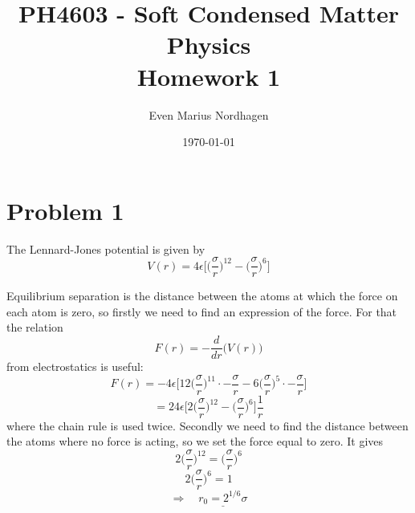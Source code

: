 \documentclass[norsk,a4paper,12pt]{article}
\title{PH4603 - Soft Condensed Matter Physics\\\vspace{2mm} \Large{Homework 1}}
\author{\large Even Marius Nordhagen}
\date\today
\begin{document}
\maketitle

\section*{Problem 1}
The Lennard-Jones potential is given by
\begin{equation}
V(r)=4\epsilon\Bigg[\bigg(\frac{\sigma}{r}\bigg)^{12}-\bigg(\frac{\sigma}{r}\bigg)^6\Bigg]
\end{equation}

Equilibrium separation is the distance between the atoms at which the force on each atom is zero, so firstly we need to find an expression of the force. For that the relation
\begin{equation}
F(r)=-\frac{d}{dr}\Big(V(r)\Big)
\end{equation}
from electrostatics is useful:
$$F(r)=-4\epsilon\Bigg[12\bigg(\frac{\sigma}{r}\bigg)^{11}\cdot-\frac{\sigma}{r}-6\bigg(\frac{\sigma}{r}\bigg)^5\cdot-\frac{\sigma}{r}\Bigg]$$
\begin{equation}
\label{eq:force}
=24\epsilon\Bigg[2\bigg(\frac{\sigma}{r}\bigg)^{12}-\bigg(\frac{\sigma}{r}\bigg)^6\Bigg]\frac{1}{r}
\end{equation}
where the chain rule is used twice. Secondly we need to find the distance between the atoms where no force is acting, so we set the force equal to zero. It gives
$$2\bigg(\frac{\sigma}{r}\bigg)^{12}=\bigg(\frac{\sigma}{r}\bigg)^6$$
$$2\bigg(\frac{\sigma}{r}\bigg)^6=1$$
\begin{equation}
\Rightarrow \quad\underline{r_0=2^{1/6}\sigma}
\end{equation}
\newpage
\end{document}
